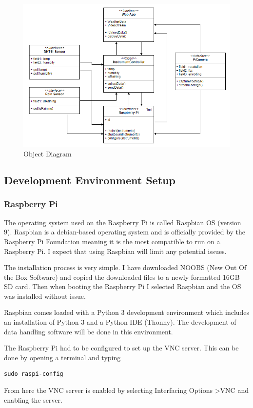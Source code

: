 \documentclass[10pt,a4paper]{article}
\begin{document}
\begin{figure}[H]
\centering
  \includegraphics[width=\linewidth]{images/objects.png}
  \caption{Object Diagram}
  \label{fig:objects}
\end{figure}

\subsection{Development Environment Setup}
\subsubsection{Raspberry Pi}
The operating system used on the Raspberry Pi is called Raspbian OS (version 9). Raspbian is a debian-based operating system and is officially provided by the Raspberry Pi Foundation meaning it is the most compatible to run on a Raspberry Pi. I expect that using Raspbian will limit any potential issues. 

The installation process is very simple. I have downloaded NOOBS (New Out Of the Box Software) and copied the downloaded files to a newly formatted 16GB SD card. Then when booting the Raspberry Pi I selected Raspbian and the OS was installed without issue. 

Raspbian comes loaded with a Python 3 development environment which includes an installation of Python 3 and a Python IDE (Thonny). The development of data handling software will be done in this environment. 

The Raspberry Pi had to be configured to set up the VNC server. This can be done by opening a terminal and typing \begin{verbatim}
sudo raspi-config
\end{verbatim} From here the VNC server is enabled by selecting Interfacing Options \textgreater VNC and enabling the server.
\end{document}
